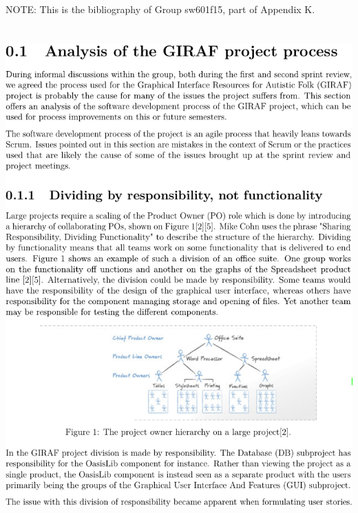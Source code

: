 \noindent\textsf{NOTE:} This is the bibliography of Group sw601f15, part of Appendix K\@.\\\\\\
\includegraphics[page=7,width=\textwidth]{part_appendix/sw601f15.pdf}